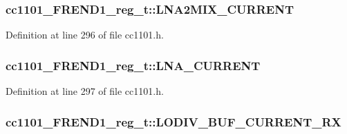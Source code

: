\subsubsection[{\texorpdfstring{L\+N\+A2\+M\+I\+X\+\_\+\+C\+U\+R\+R\+E\+NT}{LNA2MIX_CURRENT}}]{ cc1101\+\_\+\+F\+R\+E\+N\+D1\+\_\+reg\+\_\+t\+::\+L\+N\+A2\+M\+I\+X\+\_\+\+C\+U\+R\+R\+E\+NT}\hypertarget{structcc1101___f_r_e_n_d1__reg__t_ab74c64c42046e6ef22af36cb08d5d98f}{}\label{structcc1101___f_r_e_n_d1__reg__t_ab74c64c42046e6ef22af36cb08d5d98f}


Definition at line 296 of file cc1101.\+h.

\subsubsection[{\texorpdfstring{L\+N\+A\+\_\+\+C\+U\+R\+R\+E\+NT}{LNA_CURRENT}}]{ cc1101\+\_\+\+F\+R\+E\+N\+D1\+\_\+reg\+\_\+t\+::\+L\+N\+A\+\_\+\+C\+U\+R\+R\+E\+NT}\hypertarget{structcc1101___f_r_e_n_d1__reg__t_a55069e0c05af5c05a1de0e0789bb37cd}{}\label{structcc1101___f_r_e_n_d1__reg__t_a55069e0c05af5c05a1de0e0789bb37cd}


Definition at line 297 of file cc1101.\+h.

\subsubsection[{\texorpdfstring{L\+O\+D\+I\+V\+\_\+\+B\+U\+F\+\_\+\+C\+U\+R\+R\+E\+N\+T\+\_\+\+RX}{LODIV_BUF_CURRENT_RX}}]{ cc1101\+\_\+\+F\+R\+E\+N\+D1\+\_\+reg\+\_\+t\+::\+L\+O\+D\+I\+V\+\_\+\+B\+U\+F\+\_\+\+C\+U\+R\+R\+E\+N\+T\+\_\+\+RX}\hypertarget{structcc1101___f_r_e_n_d1__reg__t_a124b91288b0a8cb9e76ed6634061fde9}{}\label{structcc1101___f_r_e_n_d1__reg__t_a124b91288b0a8cb9e76ed6634061fde9}


